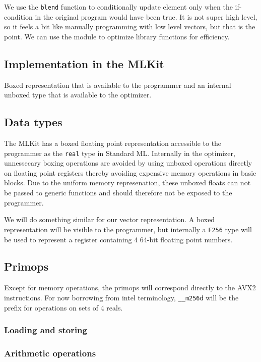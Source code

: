 \documentclass{article}
\begin{document}
We use the \verb!blend! function to conditionally update element only when the if-condition in the original program would have been true. It is not super high level, so it feels a bit like manually programming with low level vectors, but that is the point. We can use the module to optimize library functions for efficiency.

\subsection{Implementation in the MLKit}

Boxed representation that is available to the programmer and an internal unboxed type that is available to the optimizer.

\subsection{Data types}

The MLKit has a boxed floating point representation accessible to the programmer as the \verb!real! type in Standard ML. Internally in the optimizer, unnessecary boxing operations are avoided by using unboxed operations directly on floating point registers thereby avoiding expensive memory operations in basic blocks. Due to the uniform memory represenation, these unboxed floats can not be passed to generic functions and should therefore not be exposed to the programmer.

We will do something similar for our vector representation. A boxed representation will be visible to the programmer, but internally a \verb!F256! type will be used to represent a register containing 4 64-bit floating point numbers.

\subsection{Primops}

Except for memory operations, the primops will correspond directly to the AVX2 instructions. For now borrowing from intel terminology, \verb!__m256d! will be the prefix for operations on sets of 4 reals.

\subsubsection{Loading and storing}

\subsubsection{Arithmetic operations}
\end{document}
